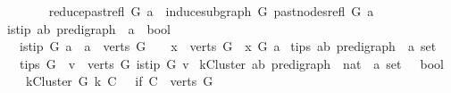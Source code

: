 \begin{isabellebody}
\ \ \ \isanewline
\ \ \ \ {\isachardoublequoteopen}reduce{\isacharunderscore}{\kern0pt}past{\isacharunderscore}{\kern0pt}refl\ G\ a\ {\isacharequal}{\kern0pt}\ induce{\isacharunderscore}{\kern0pt}subgraph\ G\ {\isacharparenleft}{\kern0pt}past{\isacharunderscore}{\kern0pt}nodes{\isacharunderscore}{\kern0pt}refl\ G\ a{\isacharparenright}{\kern0pt}{\isachardoublequoteclose}\isanewline
\isanewline
{}\isamarkupfalse%
\ is{\isacharunderscore}{\kern0pt}tip{\isacharcolon}{\kern0pt}{\isacharcolon}{\kern0pt}\ {\isachardoublequoteopen}{\isacharparenleft}{\kern0pt}{\isacharprime}{\kern0pt}a{\isacharcomma}{\kern0pt}{\isacharprime}{\kern0pt}b{\isacharparenright}{\kern0pt}\ pre{\isacharunderscore}{\kern0pt}digraph\ {\isasymRightarrow}\ {\isacharprime}{\kern0pt}a\ {\isasymRightarrow}\ bool{\isachardoublequoteclose}\isanewline
\ \ \ {\isachardoublequoteopen}is{\isacharunderscore}{\kern0pt}tip\ G\ a\ {\isacharequal}{\kern0pt}\ {\isacharparenleft}{\kern0pt}{\isacharparenleft}{\kern0pt}a\ {\isasymin}\ verts\ G{\isacharparenright}{\kern0pt}\ {\isasymand}\ \ {\isacharparenleft}{\kern0pt}{\isasymforall}\ x\ {\isasymin}\ verts\ G{\isachardot}{\kern0pt}\ {\isasymnot}\ x\ {\isasymrightarrow}\isactrlsup {\isacharplus}{\kern0pt}\isactrlbsub G\isactrlesub \ a{\isacharparenright}{\kern0pt}{\isacharparenright}{\kern0pt}{\isachardoublequoteclose}\isanewline
\isanewline
{}\isamarkupfalse%
\ tips{\isacharcolon}{\kern0pt}{\isacharcolon}{\kern0pt}\ {\isachardoublequoteopen}{\isacharparenleft}{\kern0pt}{\isacharprime}{\kern0pt}a{\isacharcomma}{\kern0pt}{\isacharprime}{\kern0pt}b{\isacharparenright}{\kern0pt}\ pre{\isacharunderscore}{\kern0pt}digraph\ {\isasymRightarrow}\ {\isacharprime}{\kern0pt}a\ set{\isachardoublequoteclose}\isanewline
\ \ \ {\isachardoublequoteopen}tips\ G\ {\isacharequal}{\kern0pt}\ {\isacharbraceleft}{\kern0pt}v\ {\isasymin}\ verts\ G{\isachardot}{\kern0pt}\ is{\isacharunderscore}{\kern0pt}tip\ G\ v{\isacharbraceright}{\kern0pt}{\isachardoublequoteclose}\isanewline
\isanewline
{}\isamarkupfalse%
\ kCluster{\isacharcolon}{\kern0pt}{\isacharcolon}{\kern0pt}\ {\isachardoublequoteopen}{\isacharparenleft}{\kern0pt}{\isacharprime}{\kern0pt}a{\isacharcomma}{\kern0pt}{\isacharprime}{\kern0pt}b{\isacharparenright}{\kern0pt}\ pre{\isacharunderscore}{\kern0pt}digraph\ {\isasymRightarrow}\ nat\ {\isasymRightarrow}\ {\isacharprime}{\kern0pt}a\ set\ \ {\isasymRightarrow}\ bool{\isachardoublequoteclose}\isanewline
\ \ \ \ {\isachardoublequoteopen}kCluster\ G\ k\ C\ {\isacharequal}{\kern0pt}\ \ {\isacharparenleft}{\kern0pt}if\ {\isacharparenleft}{\kern0pt}C\ {\isasymsubseteq}\ {\isacharparenleft}{\kern0pt}verts\ G{\isacharparenright}{\kern0pt}{\isacharparenright}{\kern0pt}\isanewline

\end{isabellebody}
